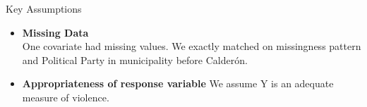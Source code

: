 \documentclass[final]{beamer}
\newlength{\onecolwid}
\begin{document}
\begin{frame}[t]
\begin{columns}[t]
\begin{column}{\onecolwid}
\begin{block}{Key Assumptions}
{\begin{itemize}
        \item \textbf{Missing Data}\\
           One covariate had missing values. We exactly matched on missingness pattern and Political Party in municipality before Calder\'{o}n. 
        \item \textbf{Appropriateness of response variable} We assume Y is an adequate measure of violence.	 %
        \end{itemize}
      }
      \end{block}

    \end{column}


\end{columns}
\end{frame}
\end{document}
